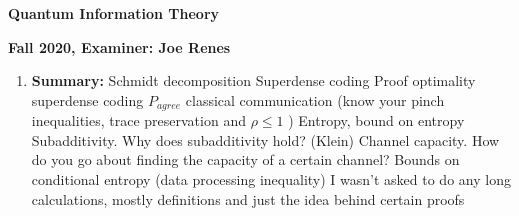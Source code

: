 \documentclass{article}%
\begin{document}
%
\normalsize%
\begin{center}%
\begin{Large}%
\textbf{Quantum Information Theory}%
\end{Large}%
\linebreak%
\end{center}%
\begin{center}%
\begin{large}%
\textbf{Fall 2020, Examiner: Joe Renes}%
\end{large}%
\end{center}%
\begin{enumerate}%
\item%
\begin{mycolorbox}%
\textbf{Summary:}%
\newline%
Schmidt decomposition\newline%
 Superdense coding\newline%
 Proof optimality superdense coding\newline%
$P_{agree}$ %
 classical communication (know your pinch inequalities, trace preservation and %
$\rho \leq 1$%
)\newline%
 Entropy, bound on entropy\newline%
 Subadditivity. Why does subadditivity hold? (Klein)\newline%
 Channel capacity. How do you go about finding the capacity of a certain channel?\newline%
 Bounds on conditional entropy (data processing inequality)\newline%
 I wasn't asked to do any long calculations, mostly definitions and just the idea behind certain proofs%
\end{mycolorbox}%
\end{enumerate}%
\newpage%
\end{document}
